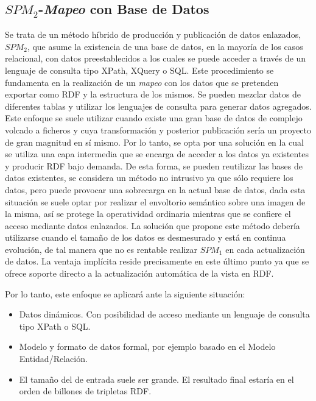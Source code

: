 \subsection{$SPM_2$-\textit{Mapeo} con Base de Datos}\label{mapeo-bbdd}
Se trata de un método híbrido de producción y publicación de datos enlazados, $SPM_2$, que asume la existencia de una base de datos, en la mayoría de los casos
relacional, con datos preestablecidos a los cuales se puede acceder a través de un lenguaje de consulta
tipo \gls{XPath}, \gls{XQuery} o \gls{SQL}. Este procedimiento se fundamenta en la realización de un \textit{mapeo} con los datos
que se pretenden exportar como \gls{RDF} y la estructura de los mismos. Se pueden mezclar datos de diferentes tablas
y utilizar los lenguajes de consulta para generar datos agregados. Este enfoque se suele utilizar cuando
existe una gran base de datos de complejo volcado a ficheros y cuya transformación y posterior publicación
sería un proyecto de gran magnitud en sí mismo. Por lo tanto, se opta por una solución en la cual se utiliza una capa
intermedia que se encarga de acceder a los datos ya existentes y producir RDF bajo demanda. De esta forma,
se pueden reutilizar las bases de datos existentes, se considera un método no intrusivo ya que sólo requiere los
datos, pero puede provocar una sobrecarga en la actual base de datos, dada esta situación se suele optar por realizar
el envoltorio semántico sobre una imagen de la misma, así se protege la operatividad ordinaria mientras que se
 confiere el acceso mediante datos enlazados. La solución que propone este método debería utilizarse cuando el tamaño
de los datos es desmesurado y está en continua evolución, de tal manera que no es rentable realizar $SPM_1$ en
cada actualización de datos. La ventaja implícita reside precisamente en este último punto ya que se ofrece soporte
directo a la actualización automática de la vista en RDF. 


Por lo tanto, este enfoque se aplicará ante la siguiente situación:
\begin{itemize}
 \item Datos dinámicos. Con posibilidad de acceso mediante un lenguaje de consulta tipo XPath o SQL.
 \item Modelo y formato de datos formal, por ejemplo basado en el Modelo Entidad/Relación.
 \item El tamaño del \dataset de entrada suele ser grande. El resultado final
estaría en el orden de billones de tripletas RDF.
\end{itemize}


